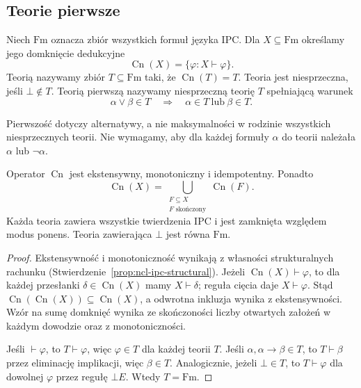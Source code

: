 \subsection{Teorie pierwsze}

\begin{definicja}
\label{def:ncl-ipc-prime-theory}
Niech $\mathrm{Fm}$ oznacza zbiór wszystkich formuł
języka IPC. Dla $X\subseteq\mathrm{Fm}$ określamy
jego domknięcie dedukcyjne
\[
 \operatorname{Cn}(X)=\{\varphi:X\vdash\varphi\}.
\]
Teorią nazywamy zbiór $T\subseteq\mathrm{Fm}$
taki, że $\operatorname{Cn}(T)=T$.
Teoria jest niesprzeczna, jeśli $\bot\notin T$.
Teorią pierwszą nazywamy niesprzeczną teorię $T$
spełniającą warunek
\[
 \alpha\vee\beta\in T
 \quad\Longrightarrow\quad
 \alpha\in T\ \text{lub}\ \beta\in T.
\]
\end{definicja}
Pierwszość dotyczy alternatywy, a nie maksymalności
w rodzinie wszystkich niesprzecznych teorii.
Nie wymagamy, aby dla każdej formuły $\alpha$
do teorii należała $\alpha$ lub $\neg\alpha$.

\begin{lemat}
\label{lem:ncl-ipc-deductive-closure}
Operator $\operatorname{Cn}$ jest ekstensywny,
monotoniczny i idempotentny. Ponadto
\[
 \operatorname{Cn}(X)=
 \bigcup_{\substack{F\subseteq X\\ F\text{ skończony}}}
 \operatorname{Cn}(F).
\]
Każda teoria zawiera wszystkie twierdzenia IPC
i jest zamknięta względem modus ponens. Teoria
zawierająca $\bot$ jest równa $\mathrm{Fm}$.
\end{lemat}
\begin{proof}
Ekstensywność i monotoniczność wynikają z własności
strukturalnych rachunku
(Stwierdzenie~\ref{prop:ncl-ipc-structural}).
Jeżeli $\operatorname{Cn}(X)\vdash\varphi$, to
dla każdej przesłanki $\delta\in\operatorname{Cn}(X)$
mamy $X\vdash\delta$; reguła cięcia daje $X\vdash\varphi$.
Stąd $\operatorname{Cn}(\operatorname{Cn}(X))
\subseteq\operatorname{Cn}(X)$, a odwrotna inkluzja
wynika z ekstensywności.
Wzór na sumę domknięć wynika ze skończoności
liczby otwartych założeń w każdym dowodzie
oraz z monotoniczności.

Jeśli $\vdash\varphi$, to $T\vdash\varphi$,
więc $\varphi\in T$ dla każdej teorii $T$.
Jeśli $\alpha,\alpha\to\beta\in T$, to
$T\vdash\beta$ przez eliminację implikacji,
więc $\beta\in T$. Analogicznie, jeżeli $\bot\in T$,
to $T\vdash\varphi$ dla dowolnej $\varphi$ przez
regułę $\bot E$. Wtedy $T=\mathrm{Fm}$.
\end{proof}

